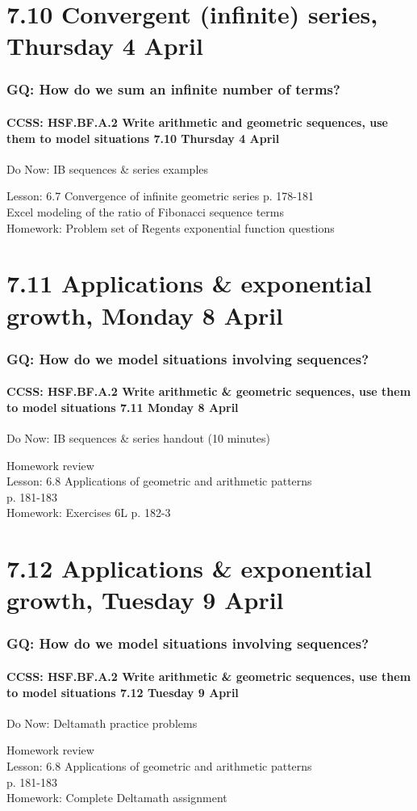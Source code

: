 \documentclass{beamer}
\begin{document}
\section{7.10 Convergent (infinite) series, Thursday 4 April}
  \frame
  {
    \frametitle{GQ: How do we sum an infinite number of terms?}
    \framesubtitle{CCSS: HSF.BF.A.2 Write arithmetic and geometric sequences, use them to model situations \hfill \alert{7.10 Thursday 4 April}}

    \begin{block}{Do Now: IB sequences \& series examples}
    \end{block}
    Lesson: 6.7 Convergence of infinite geometric series p. 178-181\\
    Excel modeling of the ratio of Fibonacci sequence terms\\[1cm]
    Homework: Problem set of Regents exponential function questions
  }

\section{7.11 Applications \& exponential growth, Monday 8 April}
  \frame
  {
    \frametitle{GQ: How do we model situations involving sequences?}
    \framesubtitle{CCSS: HSF.BF.A.2 Write arithmetic \& geometric sequences, use them to model situations \hfill \alert{7.11 Monday 8 April}}

    \begin{block}{Do Now: IB sequences \& series handout (10 minutes)}
    \end{block}
    Homework review\\
    Lesson: 6.8 Applications of geometric and arithmetic patterns \\p. 181-183\\[1cm]
    Homework: Exercises 6L p.  182-3
  }

\section{7.12 Applications \& exponential growth, Tuesday 9 April}
  \frame
  {
    \frametitle{GQ: How do we model situations involving sequences?}
    \framesubtitle{CCSS: HSF.BF.A.2 Write arithmetic \& geometric sequences, use them to model situations \hfill \alert{7.12 Tuesday 9 April}}

    \begin{block}{Do Now: Deltamath practice problems}
    \end{block}
    Homework review\\
    Lesson: 6.8 Applications of geometric and arithmetic patterns \\p. 181-183\\[1cm]
    Homework: Complete Deltamath assignment
  }
\end{document}
